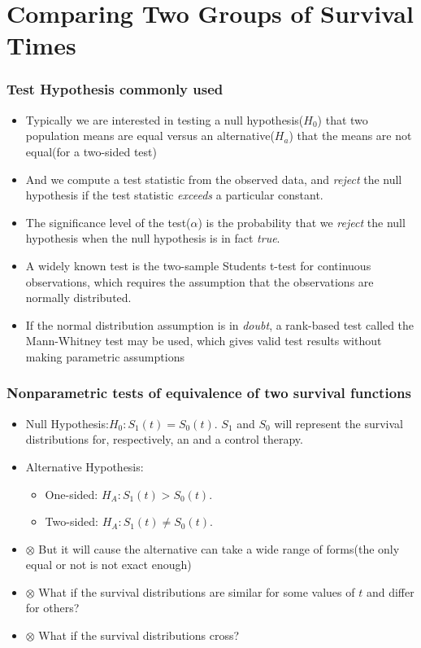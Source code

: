 \documentclass{beamer}
\newcommand{\empr}[1]{{\emph{\color{red}#1}}}
\begin{document}
\section{Comparing Two Groups of Survival Times}
\begin{frame}
\frametitle{Test Hypothesis commonly used}
\begin{itemize}
\item Typically we are interested in testing a {\color{red}null hypothesis($H_0$)} that two population {\color{red}means are equal} versus an {\color{red}alternative($H_a$)} that the {\color{red}means are not equal}(for a two-sided test)
\item  And we compute a test statistic from the {\color{red}observed} data, and \empr{reject} the null hypothesis if the test statistic \empr{exceeds} a particular constant. 
\item {\color{red}The significance level of the test($\alpha$)} is the probability that we \empr{reject} the null hypothesis when the {\color{red}null hypothesis} is in fact \empr{true}.
\item A widely known test is the {\color{red}two-sample Students t-test }for continuous observations, which requires the assumption that the observations are {\color{red}normally distributed}.
\item If the normal distribution assumption is in \empr{doubt}, a {\color{red}rank-based test} called {\color{red}the Mann-Whitney test} may be used, which gives valid test results without making parametric assumptions
\end{itemize}
\end{frame}

\pagebreak
\begin{frame}
\frametitle{Nonparametric tests of equivalence of two survival functions}
\begin{itemize}
\item {\color{red}Null Hypothesis}:\linebreak$H_0 : S_1(t) = S_0(t)$. $S_1$ and $S_0$ will represent the survival distributions for, respectively, an {\color{red}{experimental}} and a {\color{red}control therapy}.
\item {\color{red}Alternative Hypothesis}:
\begin{itemize}
\item One-sided: $H_A : S_1(t) > S_0(t)$.
\item Two-sided: $H_A : S_1(t) \neq S_0(t)$.
\end{itemize}
\item {\color{orange}$\otimes$} But it will cause the alternative can take a wide range of forms(the only equal or not is not exact enough)
\item {\color{blue}$\otimes$} What if the survival distributions are similar for some values of $t$ and differ for others?
\item {\color{purple}$\otimes$} What if the survival distributions cross?
\end{itemize}
\end{frame}
\end{document}
